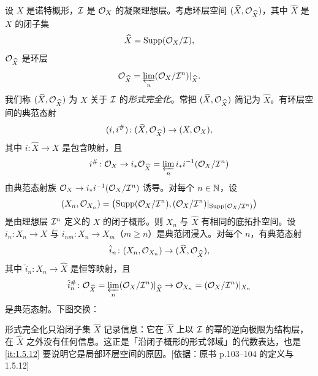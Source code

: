 设 $X$ 是诺特概形，$\mathcal{I}$ 是 $\mathcal{O}_X$ 的凝聚理想层。考虑环层空间 $(\widehat X,\mathcal{O}_{\widehat X})$，其中 $\widehat X$ 是 $X$ 的闭子集
\[
\widehat X=\operatorname{Supp}(\mathcal{O}_X/\mathcal{I}),
\]
$\mathcal{O}_{\widehat X}$ 是环层
\[
\mathcal{O}_{\widehat X}=\varprojlim_n(\mathcal{O}_X/\mathcal{I}^n)|_{\widehat X}.
\]
我们称 $(\widehat X,\mathcal{O}_{\widehat X})$ 为 $X$ 关于 $\mathcal{I}$ 的\emph{形式完全化}。常把 $(\widehat X,\mathcal{O}_{\widehat X})$ 简记为 $\widehat X$。有环层空间的典范态射
\[
(i,i^\#)\colon(\widehat X,\mathcal{O}_{\widehat X})\to(X,\mathcal{O}_X),
\]
其中 $i\colon\widehat X\to X$ 是包含映射，且
\[
i^\#\colon\mathcal{O}_X\to i_*\mathcal{O}_{\widehat X}=\varprojlim_n i_*i^{-1}(\mathcal{O}_X/\mathcal{I}^n)
\]
由典范态射族 $\mathcal{O}_X\to i_*i^{-1}(\mathcal{O}_X/\mathcal{I}^n)$ 诱导。对每个 $n\in\mathbb{N}$，设
\[
(X_n,\mathcal{O}_{X_n})=\bigl(\operatorname{Supp}(\mathcal{O}_X/\mathcal{I}^n),(\mathcal{O}_X/\mathcal{I}^n)|_{\operatorname{Supp}(\mathcal{O}_X/\mathcal{I}^n)}\bigr)
\]
是由理想层 $\mathcal{I}^n$ 定义的 $X$ 的闭子概形。则 $X_n$ 与 $\widehat X$ 有相同的底拓扑空间。设 $i_n\colon X_n\to X$ 与 $i_{nm}\colon X_n\to X_m$（$m\ge n$）是典范闭浸入。对每个 $n$，有典范态射
\[
\hat i_n\colon(X_n,\mathcal{O}_{X_n})\to(\widehat X,\mathcal{O}_{\widehat X}),
\]
其中 $\hat i_n\colon X_n\to\widehat X$ 是恒等映射，且
\[
\hat i_n^\#\colon\mathcal{O}_{\widehat X}=\varprojlim_n(\mathcal{O}_X/\mathcal{I}^n)|_{\widehat X}\to\mathcal{O}_{X_n}=(\mathcal{O}_X/\mathcal{I}^n)|_{X_n}
\]
是典范态射。下图交换：
\begin{center}
\end{center}
\begin{tnote}
形式完全化只沿闭子集 $\widehat X$ 记录信息：它在 $\widehat X$ 上以 $\mathcal{I}$ 的幂的逆向极限为结构层，在 $\widehat X$ 之外没有任何信息。这正是「沿闭子概形的形式邻域」的代数表达，也是 \ref{it:1.5.12} 要说明它是局部环层空间的原因。[依据：原书 p.103–104 的定义与 1.5.12]
\end{tnote}
